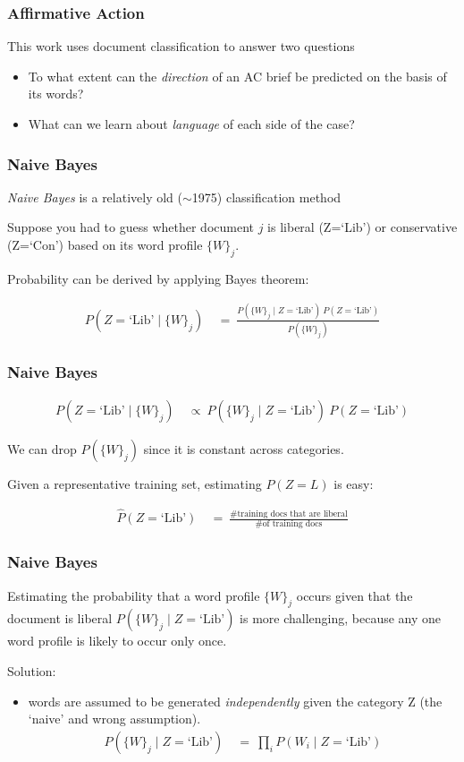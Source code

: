 \documentclass[11pt,compress,professionalfonts]{beamer}
\newcommand{\ita}{\begin{itemize}}
\newcommand{\itm}{\item[]}
\newcommand{\itz}{\end{itemize}}
\begin{document}
\begin{frame}[t,fragile]\frametitle{Affirmative Action}

This work uses document classification to answer two questions
\ita
\itm To what extent can the \textsl{direction} of an AC brief be predicted on the basis of its words?
\itm What can we learn about \textsl{language} of each side of the case?
\itz

\end{frame}
\begin{frame}[t,fragile]\frametitle{Naive Bayes}

\textsl{Naive Bayes} is a relatively old ($\sim$1975)  classification method

Suppose you had to guess  whether document $j$ is liberal (Z=`Lib') or conservative (Z=`Con') based on its word profile $\{W\}_j$.

Probability can be derived by applying Bayes theorem:

\begin{align*}
P(Z=\text{`Lib'} \mid \{W\}_j) &~=~ \frac{P(\{W\}_j \mid Z=\text{`Lib'})~P(Z=\text{`Lib'})}{P(\{W\}_j)}
\end{align*}

\end{frame}
\begin{frame}[t,fragile]\frametitle{Naive Bayes}

\begin{align*}
P(Z=\text{`Lib'} \mid \{W\}_j) &~\propto~ P(\{W\}_j \mid Z=\text{`Lib'})~P(Z=\text{`Lib'})
\end{align*}

We can drop $P(\{W\}_j)$ since it is constant across categories.

Given a representative training set, estimating $P(Z=L)$ is easy:

\begin{align*}
\hat{P}(Z=\text{`Lib'})&~=~ \frac{\text{\# training docs that are liberal}}
{\text{\# of training docs}}
\end{align*}

\end{frame}
\begin{frame}[t,fragile]\frametitle{Naive Bayes}

Estimating the probability that a word profile $\{W\}_j$ occurs given that the document is liberal $P(\{W\}_j\mid Z=\text{`Lib'})$ is more challenging, because any one word profile is likely to occur only once.

Solution:
\ita
\itm words are assumed to be generated \textit{independently} given the category Z (the `naive' and wrong assumption).
\begin{align*}
P(\{W\}_j \mid Z=\text{`Lib'}) &~=~ {\prod}_i P(W_i \mid Z=\text{`Lib'})
\end{align*}
\itz
\newpage

\end{frame}
\end{document}
